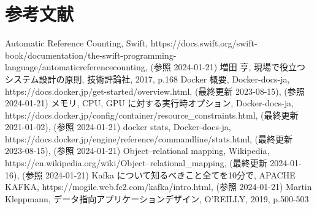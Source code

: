 \documentclass[../../main]{subfiles}
\begin{document}
    \section{参考文献}\label{sec:reference}

    \begin{thebibliography}{99}
         Automatic Reference Counting, Swift, https://docs.swift.org/swift-book/documentation/the-swift-programming-language/automaticreferencecounting, (参照 2024-01-21)
         増田 亨, 現場で役立つシステム設計の原則, 技術評論社, 2017, p.168
         Docker 概要, Docker-docs-ja, https://docs.docker.jp/get-started/overview.html, (最終更新 2023-08-15), (参照 2024-01-21)
         メモリ, CPU, GPU に対する実行時オプション, Docker-docs-ja, https://docs.docker.jp/config/container/resource\_constraints.html, (最終更新 2021-01-02), (参照 2024-01-21)
         docker stats, Docker-docs-ja, https://docs.docker.jp/engine/reference/commandline/stats.html, (最終更新 2023-08-15), (参照 2024-01-21)
         Object–relational mapping, Wikipedia, https://en.wikipedia.org/wiki/Object–relational\_mapping, (最終更新 2024-01-16), (参照 2024-01-21)
         Kafka について知るべきこと全てを10分で, APACHE KAFKA, https://mogile.web.fc2.com/kafka/intro.html, (参照 2024-01-21)
         Martin Kleppmann, データ指向アプリケーションデザイン, O'REILLY, 2019, p.500-503
    \end{thebibliography}

    \clearpage
\end{document}

